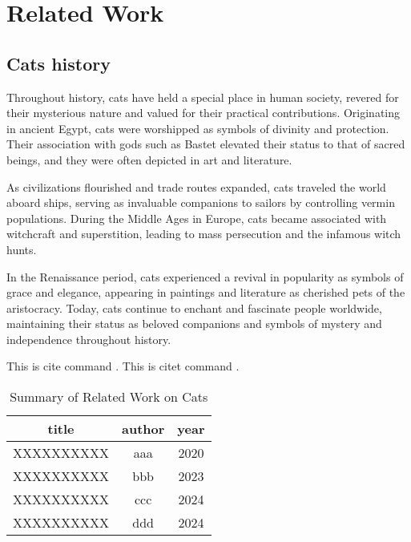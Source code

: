 \chapter{Related Work}

\section{Cats history}
Throughout history, cats have held a special place in human society, revered for their mysterious nature and valued for their practical contributions. Originating in ancient Egypt, cats were worshipped as symbols of divinity and protection. Their association with gods such as Bastet elevated their status to that of sacred beings, and they were often depicted in art and literature.

As civilizations flourished and trade routes expanded, cats traveled the world aboard ships, serving as invaluable companions to sailors by controlling vermin populations. During the Middle Ages in Europe, cats became associated with witchcraft and superstition, leading to mass persecution and the infamous witch hunts.

In the Renaissance period, cats experienced a revival in popularity as symbols of grace and elegance, appearing in paintings and literature as cherished pets of the aristocracy. Today, cats continue to enchant and fascinate people worldwide, maintaining their status as beloved companions and symbols of mystery and independence throughout history.

This is cite command \cite{supercutecat2024}. This is citet command \citet{supercutecat2024}.

\begin{table}[H]
    \centering

    \caption{Summary of Related Work on Cats}

    \begin{tabular}{ccc}
        \toprule
         title&  author& year\\
        \midrule
         XXXXXXXXXX&  aaa& 2020\\
         XXXXXXXXXX&  bbb& 2023\\
         XXXXXXXXXX&  ccc& 2024\\
         XXXXXXXXXX&  ddd& 2024\\
        \bottomrule
    \end{tabular}
    
    \label{tab:my_label}
\end{table}